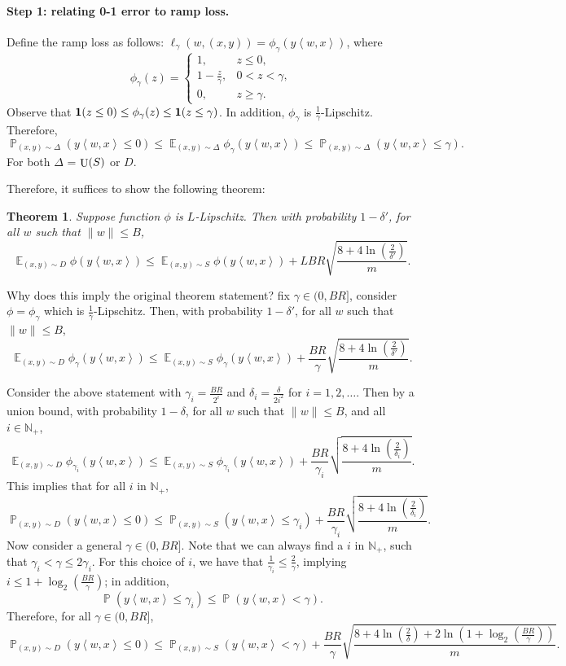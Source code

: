 \documentclass{article}
\newtheorem{theorem}{Theorem}
\DeclareMathOperator*{\U}{{\rm U}}
\DeclareMathOperator*{\EE}{{\mathbb E}}
\DeclareMathOperator*{\PP}{{\mathbb P}}
\newcommand{\NN}{\mathbb{N}}
\newcommand*{\one}{{\bf 1}}
\newcommand{\inner}[2]{\left\langle #1,#2 \right\rangle}
\begin{document}
\paragraph{Step 1: relating 0-1 error to ramp loss.} Define the ramp loss as follows:
$\ell_\gamma(w, (x,y)) = \phi_\gamma(y \inner{w}{x})$, where
\[
  \phi_\gamma(z) = \begin{cases} 1,& z \leq 0, \\ 1 - \frac{z}{\gamma}, & 0 < z < \gamma, \\ 0, & z \geq \gamma. \end{cases}
\]
Observe that $\one(z \leq 0) \leq \phi_\gamma(z) \leq \one(z \leq \gamma)$. In addition, $\phi_\gamma$ is $\frac1\gamma$-Lipschitz. Therefore,
\[
   \PP_{(x,y) \sim \Delta}(y \inner{w}{x} \leq 0)
   \leq \EE_{(x,y) \sim \Delta} \phi_\gamma(y \inner{w}{x})
   \leq \PP_{(x,y) \sim \Delta}(y \inner{w}{x} \leq \gamma).
\]
For both $\Delta$ = $\U(S)$ or $D$.

Therefore, it suffices to show the following theorem:
\begin{theorem}
Suppose function $\phi$ is $L$-Lipschitz. Then with probability $1-\delta'$, for all $w$ such that $\| w \| \leq B$,
\[
  \EE_{(x,y) \sim D} \phi(y \inner{w}{x})
  \leq \EE_{(x,y) \sim S} \phi(y \inner{w}{x})
  + L B R \sqrt{\frac{8 + 4\ln(\frac{2}{\delta'})}{m}}.
\]
\label{thm:lip-uc}
\end{theorem}

Why does this imply the original theorem statement?
fix $\gamma \in (0, BR]$, consider $\phi = \phi_\gamma$ which is $\frac 1 \gamma$-Lipschitz. Then,
with probability $1-\delta'$, for all $w$ such that $\| w \| \leq B$,
\[
  \EE_{(x,y) \sim D} \phi_\gamma(y \inner{w}{x})
  \leq \EE_{(x,y) \sim S} \phi_\gamma(y \inner{w}{x})
  + \frac{BR}{\gamma} \sqrt{\frac{8 + 4\ln(\frac{2}{\delta'})}{m}}.
\]

Consider the above statement
with $\gamma_i = \frac{BR}{2^i}$ and $\delta_i = \frac{\delta}{2i^2}$ for $i = 1,2,\ldots$. Then by a union bound, with probability $1-\delta$, for all $w$
such that $\| w \| \leq B$, and all $i \in \NN_+$,
\[
  \EE_{(x,y) \sim D} \phi_{\gamma_i}(y \inner{w}{x})
  \leq \EE_{(x,y) \sim S} \phi_{\gamma_i}(y \inner{w}{x})
  + \frac{BR}{\gamma_i} \sqrt{\frac{8 + 4\ln(\frac{2}{\delta_i})}{m}}.
\]
This implies that for all $i$ in $\NN_+$,
\[
  \PP_{(x,y) \sim D}(y \inner{w}{x} \leq 0)
  \leq \PP_{(x,y) \sim S}(y \inner{w}{x} \leq \gamma_i) + \frac{BR}{\gamma_i} \sqrt{\frac{8 + 4\ln(\frac{2}{\delta_i})}{m}}.
\]
Now consider a general $\gamma \in (0,BR]$. Note that we can always find a
$i$ in $\NN_+$, such that $\gamma_i < \gamma \leq 2\gamma_i$. For this choice of $i$,
we have that $\frac{1}{\gamma_i} \leq \frac{2}{\gamma}$, implying $i \leq 1 + \log_2(\frac{BR}{\gamma})$; in addition,
\[ \PP(y\inner{w}{x} \leq \gamma_i) \leq \PP(y\inner{w}{x} < \gamma). \]
Therefore, for all $\gamma \in (0, BR]$,
\[
\PP_{(x,y) \sim D}(y \inner{w}{x} \leq 0)
\leq \PP_{(x,y) \sim S}(y \inner{w}{x} < \gamma) + \frac{BR}{\gamma} \sqrt{\frac{8 + 4\ln(\frac{2}{\delta}) + 2\ln(1+\log_2(\frac{BR}{\gamma}))}{m}}.
\]
\end{document}
